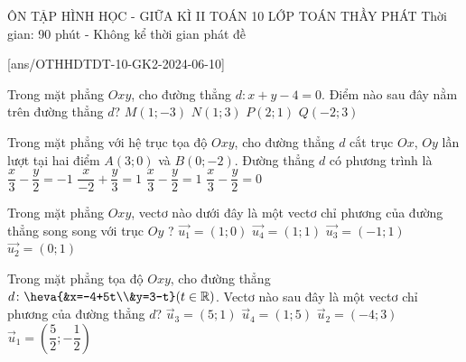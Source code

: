 \begin{name}
    {ÔN TẬP HÌNH HỌC - GIỮA KÌ II}
	{TOÁN 10}
	{LỚP TOÁN THẦY PHÁT}
	{Thời gian: 90 phút - Không kể thời gian phát đề}
\end{name}
[ans/OTHHDTDT-10-GK2-2024-06-10]
\begin{ex}%
Trong mặt phẳng $Oxy$, cho đường thẳng $d\colon x+y-4=0$. Điểm nào sau đây nằm trên đường thẳng $d$?
\choice
{$M(1;-3)$}
{\True $N(1;3)$}
{$P(2;1)$}
{$Q(-2;3)$}
\end{ex}

\begin{ex}%
Trong mặt phẳng với hệ trục tọa độ $Oxy$, cho đường thẳng $d$ cắt trục $Ox$, $Oy$ lần lượt tại hai điểm $A(3; 0)$ và $B(0;-2)$. Đường thẳng $d$ có phương trình là
\choice
{$\dfrac{x}{3}-\dfrac{y}{2}=-1$}
{$\dfrac{x}{-2}+\dfrac{y}{3}=1$}
{\True $\dfrac{x}{3}-\dfrac{y}{2}=1$}
{$\dfrac{x}{3}-\dfrac{y}{2}=0$}
\end{ex}

\begin{ex}%
Trong mặt phẳng $Oxy$, vectơ nào dưới đây là một vectơ chỉ phương của đường thẳng song song với trục $Oy$ ?
\choice
{$\overrightarrow{u_1}=(1 ; 0)$}
{$\overrightarrow{u_4}=(1 ; 1)$}
{$\overrightarrow{u_3}=(-1 ; 1)$}
{\True $\overrightarrow{u_2}=(0 ; 1)$}
\end{ex}

\begin{ex}%
Trong mặt phẳng tọa độ $Oxy$, cho đường thẳng $d\colon \heva{&x=-4+5t\\&y=3-t}(t \in \mathbb{R})$. Vectơ nào sau đây là một vectơ chỉ phương của đường thẳng $d$?
\choice
{$\overrightarrow{u}_3 = (5;1)$}
{$\overrightarrow{u}_4 = (1;5)$}
{$\overrightarrow{u}_2 = (-4;3)$}
{\True $\overrightarrow{u}_1 = \left(\dfrac{5}{2}; -\dfrac{1}{2} \right)$}
\end{ex}

